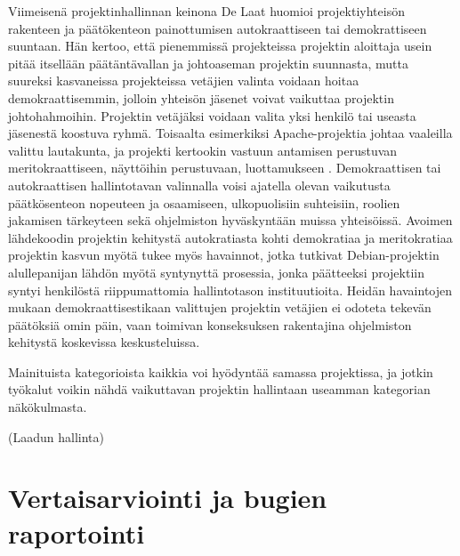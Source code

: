 \documentclass[utf8]{gradu3}
\begin{document}
Viimeisenä projektinhallinnan keinona De Laat huomioi projektiyhteisön rakenteen
ja päätökenteon painottumisen autokraattiseen tai demokrattiseen suuntaan. Hän
kertoo, että pienemmissä projekteissa projektin aloittaja usein pitää itsellään
päätäntävallan ja johtoaseman projektin suunnasta, mutta suureksi kasvaneissa
projekteissa vetäjien valinta voidaan hoitaa demokraattisemmin, jolloin yhteisön
jäsenet voivat vaikuttaa projektin johtohahmoihin. Projektin vetäjäksi voidaan
valita yksi henkilö tai useasta jäsenestä koostuva ryhmä. Toisaalta esimerkiksi
Apache-projektia johtaa vaaleilla valittu lautakunta, ja projekti kertookin
vastuun antamisen perustuvan meritokraattiseen, näyttöihin perustuvaan,
luottamukseen \parencite{Apache-2021}. Demokraattisen tai autokraattisen
hallintotavan valinnalla voisi ajatella olevan vaikutusta päätkösenteon
nopeuteen ja osaamiseen, ulkopuolisiin suhteisiin, roolien jakamisen tärkeyteen
sekä ohjelmiston hyväskyntään muissa yhteisöissä. Avoimen lähdekoodin projektin
kehitystä autokratiasta kohti demokratiaa ja meritokratiaa projektin kasvun
myötä tukee myös \textcite{OMahony-2007b} havainnot, jotka tutkivat
Debian-projektin alullepanijan lähdön myötä syntynyttä prosessia, jonka
päätteeksi projektiin syntyi henkilöstä riippumattomia hallintotason
instituutioita. Heidän havaintojen mukaan demokraattisestikaan valittujen
projektin vetäjien ei odoteta tekevän päätöksiä omin päin, vaan toimivan
konseksuksen rakentajina ohjelmiston kehitystä koskevissa keskusteluissa.

Mainituista kategorioista kaikkia voi hyödyntää samassa projektissa, ja jotkin
työkalut voikin nähdä vaikuttavan projektin hallintaan useamman kategorian
näkökulmasta.



(Laadun hallinta)

\section{Vertaisarviointi ja bugien raportointi}
\end{document}
